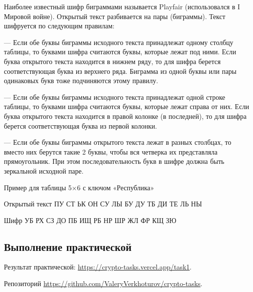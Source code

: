 Наиболее известный шифр биграммами называется Playfair
(использовался в I Мировой войне). Открытый текст разбивается на пары
(биграммы). Текст шифруется по следующим правилам:

--- Если обе буквы биграммы исходного текста принадлежат одному
столбцу таблицы, то буквами шифра считаются буквы, которые лежат под
ними. Если буква открытого текста находится в нижнем ряду, то для шифра
берется соответствующая буква из верхнего ряда. Биграмма из одной буквы
или пары одинаковых букв тоже подчиняются этому правилу.

--- Если обе буквы биграммы исходного текста принадлежат одной строке
таблицы, то буквами шифра считаются буквы, которые лежат справа от них.
Если буква открытого текста находится в правой колонке (в последней), то для
шифра берется соответствующая буква из первой колонки.

--- Если обе буквы биграммы открытого текста лежат в разных столбцах,
то вместо них берутся такие 2 буквы, чтобы вся четверка их представляла
прямоугольник. При этом последовательность букв в шифре должна быть
зеркальной исходной паре.

Пример для таблицы 5×6 с ключом «Республика» 

Открытый текст ПУ СТ ЬК ОН СУ ЛЫ БУ ДУ ТБ ДИ ТЕ ЛЬ НЫ

Шифр УБ РХ СЗ ДО ПБ ИЩ РБ НР ШР ЖЛ ФР КЩ ЗЮ

\subsection{Выполнение практической}

Результат практической: \url{https://crypto-tasks.vercel.app/task1}.

Репозиторий \url{https://github.com/ValeryVerkhoturov/crypto-tasks}.

